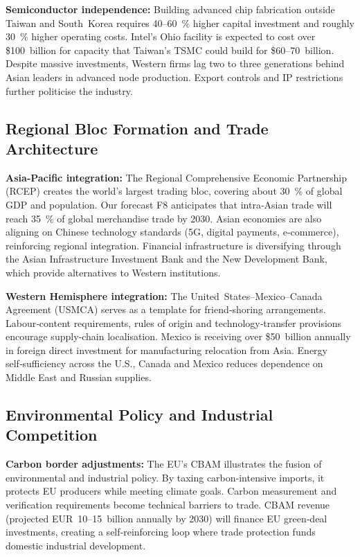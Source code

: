 \documentclass{article}
\begin{document}
\textbf{Semiconductor independence:}  Building advanced chip fabrication outside Taiwan and South Korea requires 40–60 \% higher capital investment and roughly 30 \% higher operating costs.  Intel’s Ohio facility is expected to cost over \$100 billion for capacity that Taiwan’s TSMC could build for \$60–70 billion.  Despite massive investments, Western firms lag two to three generations behind Asian leaders in advanced node production.  Export controls and IP restrictions further politicise the industry.

\subsection{Regional Bloc Formation and Trade Architecture}

\textbf{Asia‑Pacific integration:}  The Regional Comprehensive Economic Partnership (RCEP) creates the world’s largest trading bloc, covering about 30 \% of global GDP and population.  Our forecast F8 anticipates that intra‑Asian trade will reach 35 \% of global merchandise trade by 2030.  Asian economies are also aligning on Chinese technology standards (5G, digital payments, e‑commerce), reinforcing regional integration.  Financial infrastructure is diversifying through the Asian Infrastructure Investment Bank and the New Development Bank, which provide alternatives to Western institutions.

\textbf{Western Hemisphere integration:}  The United States–Mexico–Canada Agreement (USMCA) serves as a template for friend‑shoring arrangements.  Labour‑content requirements, rules of origin and technology‑transfer provisions encourage supply‑chain localisation.  Mexico is receiving over \$50 billion annually in foreign direct investment for manufacturing relocation from Asia.  Energy self‑sufficiency across the U.S., Canada and Mexico reduces dependence on Middle East and Russian supplies.

\subsection{Environmental Policy and Industrial Competition}

\textbf{Carbon border adjustments:}  The EU’s CBAM illustrates the fusion of environmental and industrial policy.  By taxing carbon‑intensive imports, it protects EU producers while meeting climate goals.  Carbon measurement and verification requirements become technical barriers to trade.  CBAM revenue (projected EUR 10–15 billion annually by 2030) will finance EU green‑deal investments, creating a self‑reinforcing loop where trade protection funds domestic industrial development.
\end{document}
